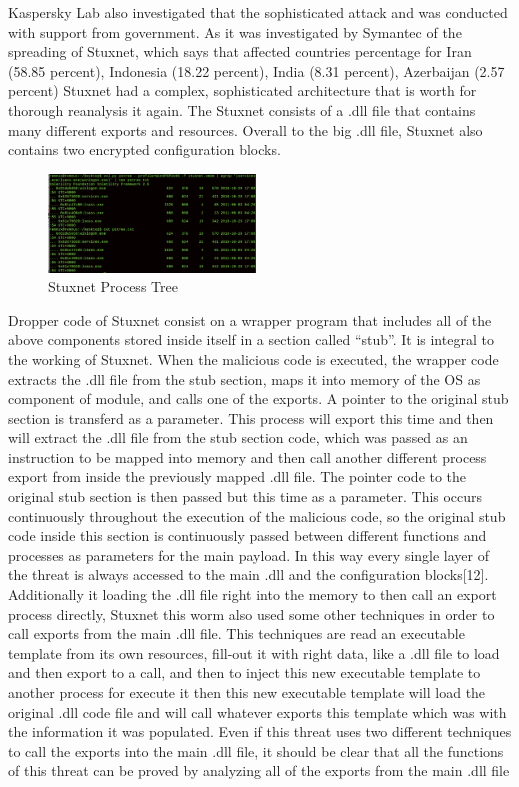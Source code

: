 \documentclass[conference]{IEEEtran}
\begin{document}
 Kaspersky Lab  also investigated  that the sophisticated attack and was conducted with support from government. As it was investigated by Symantec   of the spreading of Stuxnet, which  says that  affected countries percentage for Iran (58.85 percent), Indonesia (18.22 percent), India (8.31 percent), Azerbaijan (2.57 percent)
Stuxnet had a complex, sophisticated architecture that is worth for thorough reanalysis it again.
The Stuxnet consists of a .dll file that contains many different exports and resources. Overall to the big .dll file, Stuxnet also contains two encrypted configuration blocks.
\begin{figure}[!htb]
	\includegraphics[width=0.49\textwidth]{images/STUXNET5.png}
	\caption{Stuxnet Process Tree}
	\label{fig:TCPIP}
\end{figure}



Dropper code of Stuxnet consist on a wrapper program that includes all of the above components stored inside itself in a section called “stub”. It is integral to the working of Stuxnet. When the malicious code is executed, the wrapper code extracts the .dll file from the stub section, maps it into memory of the OS as component of module, and calls one of the exports.
A pointer to the original stub section is transferd as a parameter. This process will export this time and then will extract the .dll file from the stub section code, which was passed as an instruction to be mapped  into memory and  then call another different process export from inside the previously mapped .dll file. The pointer code to the original stub section is then passed but this time as a parameter. This occurs continuously throughout the execution of the malicious code, so the original stub code inside this section is continuously passed between different functions and processes as parameters for the main payload. In this way every single layer of the threat is always accessed to the main .dll and the configuration blocks[12].
Additionally it loading the .dll file right into the memory to then call an export process directly, Stuxnet this worm also used some other techniques in order to call exports from the main .dll file. This techniques are read an executable template from its own resources, fill-out it with right data, like a .dll file to load and then export to a call, and then to inject this new executable template to another process for execute it then this new executable template will load the original .dll code file and will call whatever exports this template which was with the information it was populated.
Even if this threat uses two different techniques to call the exports into the main .dll file, it should be clear that all the functions of this threat can be proved by analyzing all of the exports from the main .dll file
\end{document}
